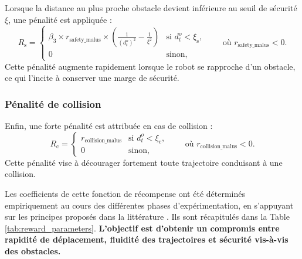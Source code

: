 \noindent Lorsque la distance au plus proche obstacle devient inférieure au seuil de sécurité $\xi$, une pénalité est appliquée :
$$
    R_\text{s} = \begin{cases}
        \beta_3 \times r_{\text{safety\_malus}} \times \left( \frac{1}{(d^o_t)^2} - \frac{1}{\xi^2} \right) & \text{si } d^o_t < \xi_{\text{s}}, \\
        0                                                                                                   & \text{sinon},
    \end{cases}
    \qquad \text{où }
    r_{\text{safety\_malus}} < 0.
$$
Cette pénalité augmente rapidement lorsque le robot se rapproche d'un obstacle, ce qui l'incite à conserver une marge de sécurité.


\subsubsection{Pénalité de collision}

\noindent Enfin, une forte pénalité est attribuée en cas de collision :
$$
    R_{\text{c}} = \begin{cases}
        r_{\text{collision\_malus}} & \text{si } d^o_t < \xi_{\text{c}}, \\
        0                           & \text{sinon},
    \end{cases}
    \qquad \text{où }
    r_{\text{collision\_malus}} < 0.
$$
Cette pénalité vise à décourager fortement toute trajectoire conduisant à une collision.

\vspace{10pt}

\noindent Les coefficients de cette fonction de récompense ont été déterminés empiriquement au cours des différentes phases d'expérimentation, en s'appuyant sur les principes proposés dans la littérature \citep{long2018, choi2021, huang2024}. Ils sont récapitulés dans la Table \ref{tab:reward_parameters}. \textbf{L'objectif est d'obtenir un compromis entre rapidité de déplacement, fluidité des trajectoires et sécurité vis-à-vis des obstacles.}
